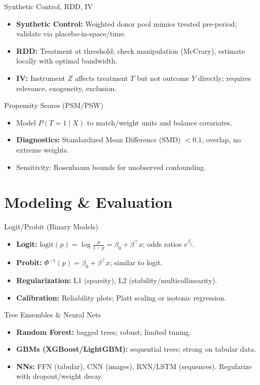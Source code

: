 \documentclass[aspectratio=169]{beamer}
\begin{document}
\begin{frame}{Synthetic Control, RDD, IV}
  \begin{itemize}
    \item \textbf{Synthetic Control:} Weighted donor pool mimics treated pre-period; validate via placebo-in-space/time.
    \item \textbf{RDD:} Treatment at threshold; check manipulation (McCrary), estimate locally with optimal bandwidth.
    \item \textbf{IV:} Instrument $Z$ affects treatment $T$ but not outcome $Y$ directly; requires relevance, exogeneity, exclusion.
  \end{itemize}
\end{frame}

\begin{frame}{Propensity Scores (PSM/PSW)}
  \begin{itemize}
    \item Model $P(T=1\mid X)$ to match/weight units and balance covariates.
    \item \textbf{Diagnostics:} Standardized Mean Difference (SMD) $<0.1$, overlap, no extreme weights.
    \item Sensitivity: Rosenbaum bounds for unobserved confounding.
  \end{itemize}
\end{frame}

\section{Modeling \& Evaluation}
\begin{frame}{Logit/Probit (Binary Models)}
  \begin{itemize}
    \item \textbf{Logit:} $\mathrm{logit}(p)=\log\frac{p}{1-p}=\beta_0+\beta^\top x$; odds ratios $e^{\beta_j}$.
    \item \textbf{Probit:} $\Phi^{-1}(p)=\beta_0+\beta^\top x$; similar to logit.
    \item \textbf{Regularization:} L1 (sparsity), L2 (stability/multicollinearity).
    \item \textbf{Calibration:} Reliability plots; Platt scaling or isotonic regression.
  \end{itemize}
\end{frame}

\begin{frame}{Tree Ensembles \& Neural Nets}
  \begin{itemize}
    \item \textbf{Random Forest:} bagged trees; robust; limited tuning.
    \item \textbf{GBMs (XGBoost/LightGBM):} sequential trees; strong on tabular data.
    \item \textbf{NNs:} FFN (tabular), CNN (images), RNN/LSTM (sequences). Regularize with dropout/weight decay.
  \end{itemize}
\end{frame}
\end{document}
